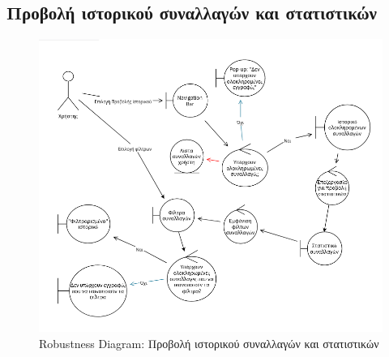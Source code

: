 \documentclass[12pt,a4paper]{article}
\begin{document}
\subsection{Προβολή ιστορικού συναλλαγών και στατιστικών}
\begin{figure}[H]
	\includegraphics[width=\textwidth]{History and Statistics Robustness.png}
	\caption{Robustness Diagram: Προβολή ιστορικού συναλλαγών και στατιστικών}
	\label{Robustness Diagram: Προβολή ιστορικού συναλλαγών και στατιστικών}
\end{figure}
\end{document}
